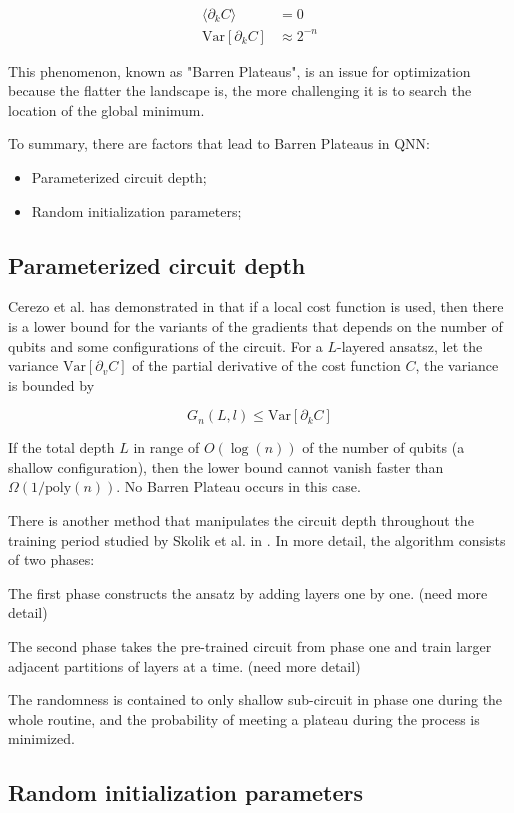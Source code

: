 \begin{align}
    \langle \partial_k C\rangle &= 0  \label{Vanish Gradient}\\
    \mathrm{Var}[\partial_k C] &\approx 2^{-n}  \label{Variance expo smaller}
\end{align}

This phenomenon, known as "Barren Plateaus", is an issue for optimization because the flatter the landscape is, the more challenging it is to search the location of the global minimum.

To summary, there are factors that lead to Barren Plateaus in QNN:
\begin{itemize}
    \item Parameterized circuit depth;
    \item Random initialization parameters;
\end{itemize}

\subsection{Parameterized circuit depth}


Cerezo et al. has demonstrated in \cite{cerezoCostFunctionDependent2021} that if a local cost function is used, then there is a lower bound for the variants of the gradients that depends on the number of qubits and some configurations of the circuit. 
For a $L$-layered ansatsz, let the variance $\mathrm{Var}[\partial_v C]$ of the partial derivative of the cost function $C$, the variance is bounded by

\begin{equation}
    G_n(L,l) \leq \mathrm{Var}[\partial_k C]
\end{equation}

If the total depth $L$ in range of $O(\log(n))$ of the number of qubits (a shallow configuration), then the lower bound cannot vanish faster than $\Omega(1/\mathrm{poly}(n))$. No Barren Plateau occurs in this case.

There is another method that manipulates the circuit depth throughout the training period studied by Skolik et al. in \cite{skolikLayerwiseLearningQuantum2021}. 
In more detail, the algorithm consists of two phases:

The first phase constructs the ansatz by adding layers one by one. (need more detail)

The second phase takes the pre-trained circuit from phase one and train larger adjacent partitions of layers at a time. (need more detail)

The randomness is contained to only shallow sub-circuit in phase one during the whole routine, and the probability of meeting a plateau during the process is minimized.

\subsection{Random initialization parameters}